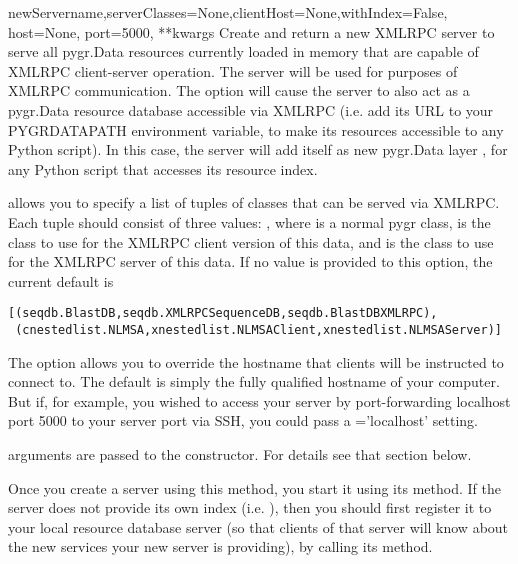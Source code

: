 \documentclass{howto}
\begin{document}
\begin{funcdesc}{newServer}{name,serverClasses=None,clientHost=None,withIndex=False, host=None, port=5000, **kwargs}
  Create and return a new XMLRPC server to serve all pygr.Data resources 
  currently loaded in memory that are capable of XMLRPC client-server
  operation.  The server  will be used for 
  purposes of XMLRPC communication.  The  option
  will cause the server to also act as a pygr.Data resource database
  accessible via XMLRPC (i.e. add its URL to your PYGRDATAPATH environment
  variable, to make its resources accessible to any Python script).
  In this case, the server will add itself as new pygr.Data layer
  , for any Python script that accesses its resource index.

   allows you to specify a list of tuples of
  classes that can be served via XMLRPC.  Each tuple should consist of
  three values: , where 
   is a normal pygr class,  is the 
  class to use for the XMLRPC client version of this data, and
   is the class to use for the XMLRPC server of
  this data.  If no value is provided to this option, the current
  default is 
\begin{verbatim}
[(seqdb.BlastDB,seqdb.XMLRPCSequenceDB,seqdb.BlastDBXMLRPC),
 (cnestedlist.NLMSA,xnestedlist.NLMSAClient,xnestedlist.NLMSAServer)] 
\end{verbatim}
  The  option allows you to override the hostname
  that clients will be instructed to connect to.  The default is simply
  the fully qualified hostname of your computer.  But if, for example,
  you wished to access your server by port-forwarding localhost port 5000
  to your server port via SSH, you could pass a ='localhost'
  setting.

   arguments are passed to the  constructor.
  For details see that section below.

  Once you create a server using this method, you start it using its
   method.  If the server does not provide its
  own index (i.e. ), then you should first register
  it to your local resource database server (so that clients of that server
  will know about the new services your new server is providing), by
  calling its  method.
\end{funcdesc}
\end{document}
